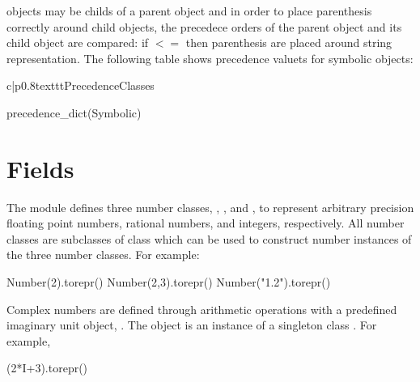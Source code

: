 \documentclass[a4paper,12pt]{article}
\begin{document}
\begin{description}
\begin{description}
    objects may be childs of a parent object and in order to place
    parenthesis correctly around child objects, the precedece orders
    of the parent object and its child object are compared: if
     $<=$
       then parenthesis are
      placed around  string representation. The following
      table shows precedence valuets for symbolic objects:
      \begin{tableii}{c|p{0.8\linewidth}}{texttt}{Precedence}{Classes}
\begin{pythonlatex}
precedence_dict(Symbolic)
\end{pythonlatex}%
%
      \end{tableii}
  \item[\code{}] 
  \end{description}
\end{description}

\section{Fields}
\label{sec:fields}

The  module defines three number classes,
, , and , to represent
arbitrary precision floating point numbers, rational numbers, and
integers, respectively. All number classes are subclasses of
 class which can be used to construct number instances
of the three number classes. For example:
\begin{python}
Number(2).torepr()
Number(2,3).torepr()
Number("1.2").torepr()
\end{python}
Complex numbers are defined through arithmetic operations with
a predefined imaginary unit object, . The object  is
an instance of a singleton class . For example,
\begin{python}
(2*I+3).torepr()
\end{python}
\end{document}

